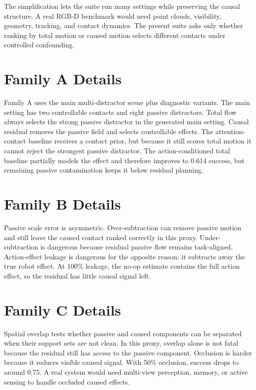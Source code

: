\documentclass{article}
\begin{document}
The simplification lets the suite run many settings while preserving the causal
structure.  A real RGB-D benchmark would need point clouds, visibility, geometry,
tracking, and contact dynamics.  The present suite asks only whether ranking by total
motion or caused motion selects different contacts under controlled confounding.

\section{Family A Details}

Family A uses the main multi-distractor scene plus diagnostic variants.  The main setting
has two controllable contacts and eight passive distractors.  Total flow always selects
the strong passive distractor in the generated main setting.  Causal residual removes the
passive field and selects controllable effects.  The attention-contact baseline receives
a contact prior, but because it still scores total motion it cannot reject the strongest
passive distractor.  The action-conditioned total baseline partially models the effect
and therefore improves to 0.614 success, but remaining passive contamination keeps it
below residual planning.

\section{Family B Details}

Passive scale error is asymmetric.  Over-subtraction can remove passive motion and still
leave the caused contact ranked correctly in this proxy.  Under-subtraction is dangerous
because residual passive flow remains task-aligned.  Action-effect leakage is dangerous
for the opposite reason: it subtracts away the true robot effect.  At 100\% leakage, the
no-op estimate contains the full action effect, so the residual has little causal signal
left.

\section{Family C Details}

Spatial overlap tests whether passive and caused components can be separated when their
support sets are not clean.  In this proxy, overlap alone is not fatal because the
residual still has access to the passive component.  Occlusion is harder because it
reduces visible caused signal.  With 50\% occlusion, success drops to around 0.75.  A real
system would need multi-view perception, memory, or active sensing to handle occluded
caused effects.
\end{document}

